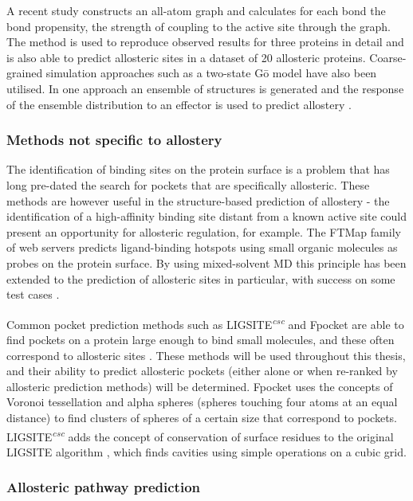 A recent study \cite{Amor2016} constructs an all-atom graph and calculates for each bond the bond propensity, the strength of coupling to the active site through the graph.
The method is used to reproduce observed results for three proteins in detail and is also able to predict allosteric sites in a dataset of 20 allosteric proteins.
Coarse-grained simulation approaches such as a two-state G\={o} model have also been utilised.
In one approach an ensemble of structures is generated and the response of the ensemble distribution to an effector is used to predict allostery \cite{Qi2012}.


\subsubsection{Methods not specific to allostery}

The identification of binding sites on the protein surface is a problem that has long pre-dated the search for pockets that are specifically allosteric.
These methods are however useful in the structure-based prediction of allostery - the identification of a high-affinity binding site distant from a known active site could present an opportunity for allosteric regulation, for example.
The FTMap family of web servers \cite{Kozakov2015} predicts ligand-binding hotspots using small organic molecules as probes on the protein surface.
By using mixed-solvent MD this principle has been extended to the prediction of allosteric sites in particular, with success on some test cases \cite{Ghanakota2016}.

Common pocket prediction methods such as LIGSITE\textsuperscript{\it csc} \cite{Huang2006} and Fpocket \cite{LeGuilloux2009} are able to find pockets on a protein large enough to bind small molecules, and these often correspond to allosteric sites \cite{Huang2013}.
These methods will be used throughout this thesis, and their ability to predict allosteric pockets (either alone or when re-ranked by allosteric prediction methods) will be determined.
Fpocket uses the concepts of Voronoi tessellation and alpha spheres (spheres touching four atoms at an equal distance) to find clusters of spheres of a certain size that correspond to pockets.
LIGSITE\textsuperscript{\it csc} adds the concept of conservation of surface residues to the original LIGSITE algorithm \cite{Hendlich1997}, which finds cavities using simple operations on a cubic grid.


\subsubsection{Allosteric pathway prediction}

